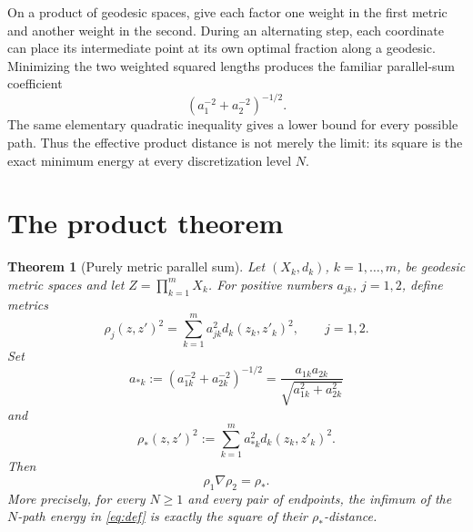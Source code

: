 \documentclass[11pt]{article}
\newtheorem{theorem}{Theorem}
\begin{document}
On a product of geodesic spaces, give each factor one weight in the first
metric and another weight in the second.  During an alternating step, each
coordinate can place its intermediate point at its own optimal fraction along
a geodesic.  Minimizing the two weighted squared lengths produces the familiar
parallel-sum coefficient
\[
\left(a_1^{-2}+a_2^{-2}\right)^{-1/2}.
\]
The same elementary quadratic inequality gives a lower bound for every
possible path.  Thus the effective product distance is not merely the limit:
its square is the exact minimum energy at every discretization level \(N\).

\section{The product theorem}

\begin{theorem}[Purely metric parallel sum]\label{thm:main}
Let \((X_k,d_k)\), \(k=1,\ldots,m\), be geodesic metric spaces and let
\(Z=\prod_{k=1}^m X_k\).  For positive numbers \(a_{jk}\), \(j=1,2\),
define metrics
\begin{equation}\label{eq:inputs}
\rho_j(z,z')^2=\sum_{k=1}^m a_{jk}^2d_k(z_k,z'_k)^2,
\qquad j=1,2.
\end{equation}
Set
\begin{equation}\label{eq:weights}
a_{*k}:=\left(a_{1k}^{-2}+a_{2k}^{-2}\right)^{-1/2}
=\frac{a_{1k}a_{2k}}{\sqrt{a_{1k}^2+a_{2k}^2}}
\end{equation}
and
\begin{equation}\label{eq:output}
\rho_*(z,z')^2:=\sum_{k=1}^m a_{*k}^2d_k(z_k,z'_k)^2.
\end{equation}
Then
\[
\rho_1\nabla\rho_2=\rho_*.
\]
More precisely, for every \(N\ge1\) and every pair of endpoints, the infimum
of the \(N\)-path energy in \eqref{eq:def} is exactly the square of their
\(\rho_*\)-distance.
\end{theorem}
\end{document}
